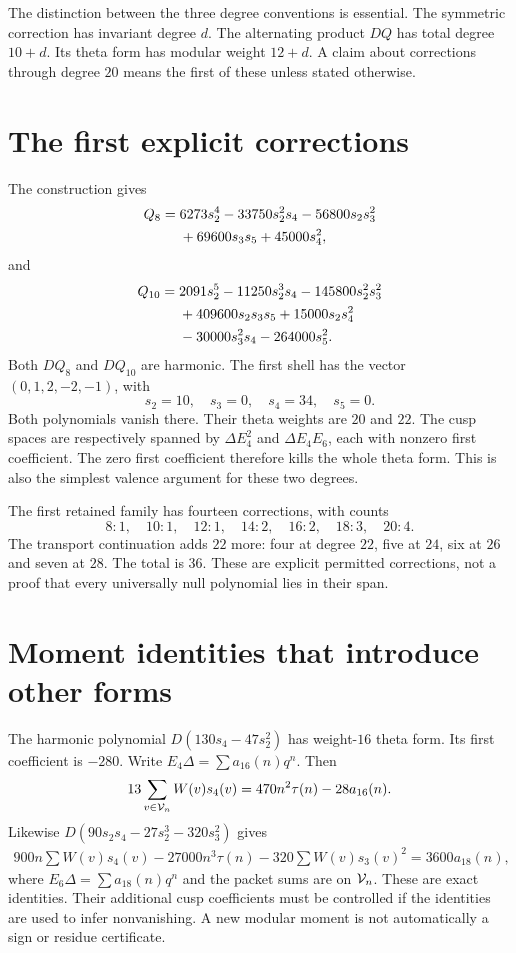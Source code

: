 The distinction between the three degree conventions is essential. The symmetric correction has invariant degree $d$. The alternating product $DQ$ has total degree $10+d$. Its theta form has modular weight $12+d$. A claim about corrections through degree $20$ means the first of these unless stated otherwise.

\section{The first explicit corrections}
The construction gives
\begin{align}\label{eq:q8}
Q_8={}&6273s_2^4-33750s_2^2s_4-56800s_2s_3^2\notag\\
&+69600s_3s_5+45000s_4^2,
\end{align}
and
\begin{align}\label{eq:q10}
Q_{10}={}&2091s_2^5-11250s_2^3s_4-145800s_2^2s_3^2\notag\\
&+409600s_2s_3s_5+15000s_2s_4^2\notag\\
&-30000s_3^2s_4-264000s_5^2.
\end{align}
Both $DQ_8$ and $DQ_{10}$ are harmonic. The first shell has the vector $(0,1,2,-2,-1)$, with
\[
s_2=10,\quad s_3=0,\quad s_4=34,\quad s_5=0.
\]
Both polynomials vanish there. Their theta weights are $20$ and $22$. The cusp spaces are respectively spanned by $\Delta E_4^2$ and $\Delta E_4E_6$, each with nonzero first coefficient. The zero first coefficient therefore kills the whole theta form. This is also the simplest valence argument for these two degrees.

The first retained family has fourteen corrections, with counts
\[
8:1,\quad10:1,\quad12:1,\quad14:2,\quad16:2,\quad18:3,\quad20:4.
\]
The transport continuation adds $22$ more: four at degree $22$, five at $24$, six at $26$ and seven at $28$. The total is $36$. These are explicit permitted corrections, not a proof that every universally null polynomial lies in their span.

\section{Moment identities that introduce other forms}
The harmonic polynomial $D(130s_4-47s_2^2)$ has weight-$16$ theta form. Its first coefficient is $-280$. Write $E_4\Delta=\sum a_{16}(n)q^n$. Then
\begin{equation}\label{eq:moment16}
13\sum_{v\in\mathcal V_n}W(v)s_4(v)
=470n^2\tau(n)-28a_{16}(n).
\end{equation}
Likewise $D(90s_2s_4-27s_2^3-320s_3^2)$ gives
\begin{align}\label{eq:moment18}
900n\sum W(v)s_4(v)-27000n^3\tau(n)
-320\sum W(v)s_3(v)^2
=3600a_{18}(n),
\end{align}
where $E_6\Delta=\sum a_{18}(n)q^n$ and the packet sums are on $\mathcal V_n$. These are exact identities. Their additional cusp coefficients must be controlled if the identities are used to infer nonvanishing. A new modular moment is not automatically a sign or residue certificate.


